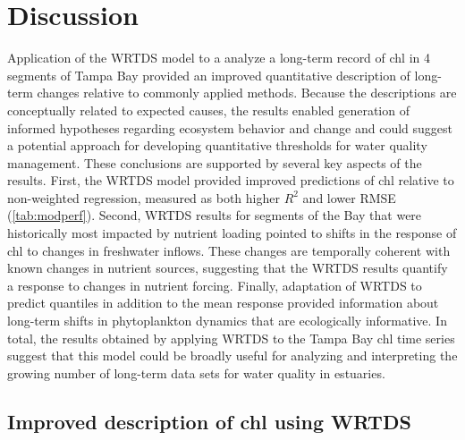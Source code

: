 \documentclass[letterpaper,12pt,oneside]{article}\usepackage{graphicx, color}
\begin{document}
\section{Discussion}

Application of the \acf{WRTDS} model to a analyze a long-term record of \ac{chl} in 4 segments of Tampa Bay provided an improved quantitative description of long-term changes relative to commonly applied methods.  Because the descriptions are conceptually related to expected causes, the results enabled generation of informed hypotheses regarding ecosystem behavior and change and could suggest a potential approach for developing quantitative thresholds for water quality management.   These conclusions are supported by several key aspects of the results.  First, the \ac{WRTDS} model provided improved predictions of \ac{chl} relative to non-weighted regression, measured as both higher $R^2$ and lower \ac{RMSE} (\cref{tab:modperf}).  Second, \ac{WRTDS} results for segments of the Bay that were historically most impacted by nutrient loading pointed to shifts in the response of \ac{chl} to changes in freshwater inflows.  These changes are temporally coherent with known changes in nutrient sources, suggesting that the \ac{WRTDS} results quantify a response to changes in nutrient forcing.  Finally, adaptation of \ac{WRTDS} to predict quantiles in addition to the mean response provided information about long-term shifts in phytoplankton dynamics that are ecologically informative.  In total, the results obtained by applying \ac{WRTDS} to the Tampa Bay \ac{chl} time series suggest that this model could be broadly useful for analyzing and interpreting the growing number of long-term data sets for water quality in estuaries.

\subsection{Improved description of \ac{chl} using \ac{WRTDS}}
\end{document}
